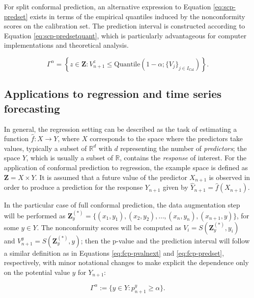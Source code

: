 For split conformal prediction, an alternative expression to Equation
\eqref{eq:scp-predset} exists in terms of the empirical quantiles induced
by the nonconformity scores on the calibration set. The prediction
interval is constructed according to Equation
\eqref{eq:scp-predsetquant}, which is particularly advantageous for
computer implementations and theoretical analysis.

\begin{equation}
\Gamma^{\alpha} = \left\{ z\in\textbf{Z}: V_{n+1}^z\leq \text{Quantile}\left(1-\alpha; \{V_j\}_{j\in I_\text{Cal}}\right) \right\}.
\label{eq:scp-predsetquant}
\end{equation}

\subsection{Applications to regression and time series forecasting}\label{applications-to-regression-and-time-series-forecasting}

In general, the regression setting can be described as the task of
estimating a function \(\hat f: X \to Y\), where
\(X\) corresponds to the space where the predictors take values,
typically a subset of \(\mathbb{R}^{d}\) with \(d\) representing the number
of \emph{predictors}; the space \(Y\), which is usually a subset of
\(\mathbb{R}\), contains the \emph{response} of interest. For the application
of conformal prediction to regression, the example space is defined as
\(\textbf{Z}=X \times Y\). It is assumed that a future
value of the predictor \(X_{n+1}\) is observed in order to produce a
prediction for the response \(Y_{n+1}\) given by
\(\hat Y_{n+1} = \hat f(X_{n+1})\).

In the particular case of full conformal prediction, the data
augmentation step will be performed as
\(\textbf{Z}^{(*)}_{y} = \{(x_1,y_1), (x_2,y_2),\ldots,(x_n,y_n), (x_{n+1},y)\}\),
for some \(y\in Y\). The nonconformity scores will be computed as
\(V_i=S(\textbf{Z}^{(*)}_{y},y_i)\) and
\(V_{n+1}^{y}=S(\textbf{Z}^{(*)}_{y},y)\); then the p-value and the
prediction interval will follow a similar definition as in Equations
\eqref{eq:fcp-pvalnext} and \eqref{eq:fcp-predset}, respectively, with
minor notational changes to make explicit the dependence only on the
potential value \(y\) for \(Y_{n+1}\):

\begin{equation}
\Gamma^{\alpha}:=\{y\in Y: p_{n+1}^{y} \geq \alpha\}.
\label{eq:fcp-regpredset}
\end{equation}

